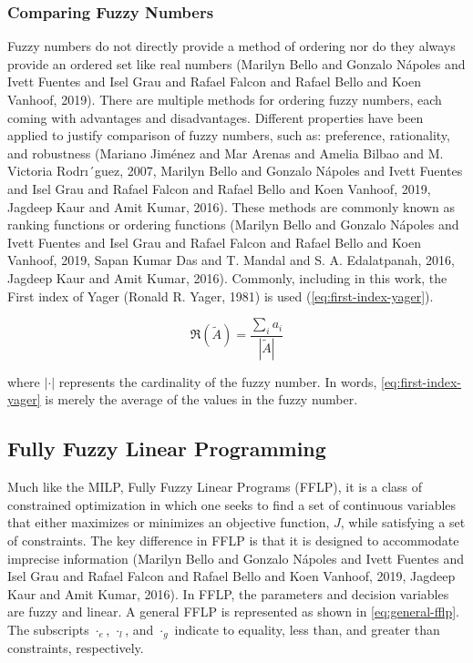 \documentclass[11pt,a4paper,final]{article}
\begin{document}
\subsubsection{Comparing Fuzzy Numbers}
\label{sec:org645e590}
Fuzzy numbers do not directly provide a method of ordering nor do they always provide an ordered set like real numbers
(Marilyn Bello and Gonzalo N{\'a}poles and Ivett Fuentes and Isel Grau and Rafael Falcon and Rafael Bello and Koen Vanhoof, 2019). There are multiple methods for ordering fuzzy numbers, each coming with advantages and
disadvantages. Different properties have been applied to justify comparison of fuzzy numbers, such as: preference,
rationality, and robustness (Mariano Jim{\'e}nez and Mar Arenas and Amelia Bilbao and M. Victoria Rodrı´guez, 2007, Marilyn Bello and Gonzalo N{\'a}poles and Ivett Fuentes and Isel Grau and Rafael Falcon and Rafael Bello and Koen Vanhoof, 2019, Jagdeep Kaur and Amit Kumar, 2016). These
methods are commonly known as ranking functions or ordering functions
(Marilyn Bello and Gonzalo N{\'a}poles and Ivett Fuentes and Isel Grau and Rafael Falcon and Rafael Bello and Koen Vanhoof, 2019, Sapan Kumar Das and T. Mandal and S. A. Edalatpanah, 2016, Jagdeep Kaur and Amit Kumar, 2016). Commonly, including in this work, the First
index of Yager (Ronald R. Yager, 1981) is used (\ref{eq:first-index-yager}).

\begin{equation}
\label{eq:first-index-yager}
\mathfrak{R}(\tilde{A}) = \frac{\sum_i a_i}{|\tilde{A}|}
\end{equation}

\noindent
where \(|\cdot|\) represents the cardinality of the fuzzy number. In words, \ref{eq:first-index-yager} is merely the average
of the values in the fuzzy number.

\subsection{Fully Fuzzy Linear Programming}
\label{sec:orgad956b3}
Much like the MILP, Fully Fuzzy Linear Programs (FFLP), it is a class of constrained optimization in which one seeks to
find a set of continuous variables that either maximizes or minimizes an objective function, \(J\), while satisfying a set
of constraints. The key difference in FFLP is that it is designed to accommodate imprecise information
(Marilyn Bello and Gonzalo N{\'a}poles and Ivett Fuentes and Isel Grau and Rafael Falcon and Rafael Bello and Koen Vanhoof, 2019, Jagdeep Kaur and Amit Kumar, 2016). In FFLP, the parameters and decision variables are fuzzy and
linear. A general FFLP is represented as shown in \ref{eq:general-fflp}. The subscripts \(\cdot_e\), \(\cdot_l\), and \(\cdot_g\) indicate to
equality, less than, and greater than constraints, respectively.
\end{document}
